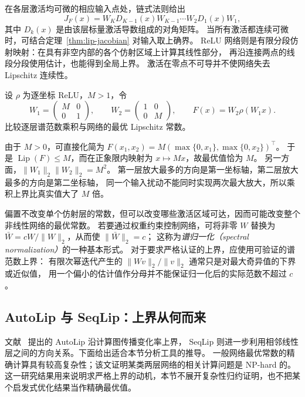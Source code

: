 \documentclass[UTF8,12pt,a4paper,fontset=fandol]{ctexart}
\begin{document}
在各层激活均可微的相应输入点处，链式法则给出
\begin{equation}\label{eq:lip-mlp-jacobian}
  J_F(x)=W_KD_{K-1}(x)W_{K-1}\cdots W_2D_1(x)W_1,
\end{equation}
其中 $D_k(x)$ 是由该层标量激活导数组成的对角矩阵。
当所有激活都连续可微时，可结合定理~\ref{thm:lip-jacobian} 对输入取上确界。
ReLU 网络则是有限分段仿射映射：在具有非空内部的各个仿射区域上计算其线性部分，
再沿连接两点的线段分段使用估计，也能得到全局上界。
激活在零点不可导并不使网络失去 Lipschitz 连续性。

\begin{example}\label{ex:lip-mlp-loose}
设 $\rho$ 为逐坐标 ReLU，$M>1$，令
\[
  W_1=\begin{pmatrix}M&0\\0&1\end{pmatrix},\qquad
  W_2=\begin{pmatrix}1&0\\0&M\end{pmatrix},\qquad
  F(x)=W_2\rho(W_1x).
\]
比较逐层谱范数乘积与网络的最优 Lipschitz 常数。
\end{example}
\begin{solve}
由于 $M>0$，可直接化简为
$F(x_1,x_2)=M(\max\{0,x_1\},\max\{0,x_2\})^\top$。
于是 $\operatorname{Lip}(F)\le M$，而在正象限内映射为 $x\mapsto Mx$，故最优值恰为 $M$。
另一方面，$\|W_1\|_2\|W_2\|_2=M^2$。
第一层放大最多的方向是第一坐标轴，第二层放大最多的方向是第二坐标轴，
同一个输入扰动不能同时实现两次最大放大，所以乘积上界比真实值大了 $M$ 倍。
\end{solve}

偏置不改变单个仿射层的常数，但可以改变哪些激活区域可达，因而可能改变整个非线性网络的最优常数。
若要通过权重约束控制网络，可将非零 $W$ 替换为
$\bar W=cW/\|W\|_2$，从而使 $\|\bar W\|_2=c$；
这称为\emph{谱归一化（spectral normalization）}的一种基本形式。
对于要求严格认证的上界，应使用可验证的谱范数上界：
有限次幂迭代产生的 $\|Wv\|_2/\|v\|_2$ 通常只是对最大奇异值的下界或近似值，
用一个偏小的估计值作分母并不能保证归一化后的实际范数不超过 $c$。

\subsection{AutoLip 与 SeqLip：上界从何而来}
\label{subsec:lip-estimation}

文献~\cite{scaman-virmaux} 提出的 AutoLip 沿计算图传播变化率上界，
SeqLip 则进一步利用相邻线性层之间的方向关系。下面给出适合本节分析工具的推导。
一般网络最优常数的精确计算具有较高复杂性；该文证明某类两层网络的相关计算问题是 NP-hard 的。
这一研究结果用来说明求严格上界的动机，本节不展开复杂性归约证明，也不把某个启发式优化结果当作精确最优值。
\end{document}
